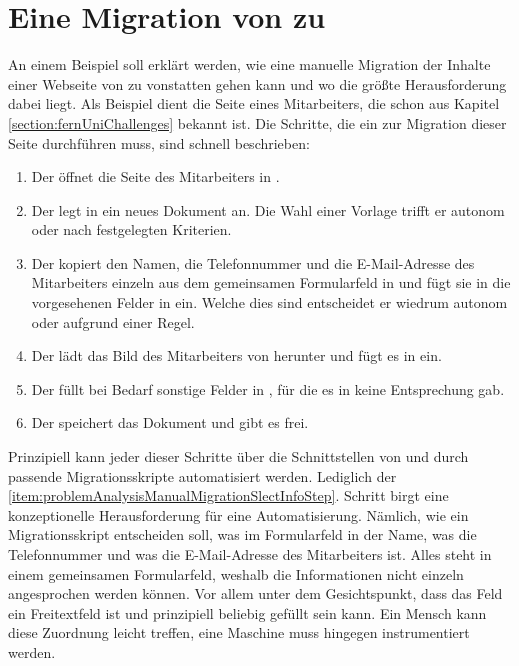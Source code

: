 \section{Eine Migration von {\wordpress} zu {\imperia}}
    An einem Beispiel soll erklärt werden,
    wie eine manuelle Migration der Inhalte einer Webseite von {\wordpress} zu {\imperia}
    vonstatten gehen kann und wo die größte Herausforderung dabei liegt.
    Als Beispiel dient die Seite eines Mitarbeiters,
    die schon aus Kapitel \ref{section:fernUniChallenges} bekannt ist.
    Die Schritte, die ein {\editor} zur Migration dieser Seite durchführen muss,
    sind schnell beschrieben:

    \begin{enumerate}
        \item   Der {\editor} öffnet die Seite des Mitarbeiters in {\wordpress}.
        \item   Der {\editor} legt in {\imperia} ein neues Dokument an.
                Die Wahl einer Vorlage trifft er autonom oder nach festgelegten Kriterien.
        \item   \label{item:problemAnalysisManualMigrationSlectInfoStep}Der {\editor} kopiert den Namen, die Telefonnummer und die E-Mail-Adresse
                des Mitarbeiters einzeln aus dem gemeinsamen Formularfeld in {\wordpress}
                und fügt sie in die vorgesehenen Felder in {\imperia} ein.
                Welche dies sind entscheidet er wiedrum autonom oder aufgrund einer Regel.
        \item   Der {\editor} lädt das Bild des Mitarbeiters von {\wordpress} herunter
                und fügt es in {\imperia} ein.
        \item   Der {\editor} füllt bei Bedarf sonstige Felder in {\imperia},
                für die es in {\wordpress} keine Entsprechung gab.
        \item   Der {\editor} speichert das Dokument und gibt es frei.
    \end{enumerate}

    Prinzipiell kann jeder dieser Schritte über die Schnittstellen von {\wordpress}
    und {\imperia} durch passende Migrationsskripte automatisiert werden.
    Lediglich der \ref{item:problemAnalysisManualMigrationSlectInfoStep}. Schritt
    birgt eine konzeptionelle Herausforderung für eine Automatisierung.
    Nämlich, wie ein Migrationsskript entscheiden soll, was im Formularfeld in {\wordpress}
    der Name, was die Telefonnummer und was die E-Mail-Adresse des Mitarbeiters ist.
    Alles steht in einem gemeinsamen Formularfeld, weshalb die Informationen nicht
    einzeln angesprochen werden können.
    Vor allem unter dem Gesichtspunkt, dass das Feld ein Freitextfeld ist und prinzipiell beliebig gefüllt sein kann.
    Ein Mensch kann diese Zuordnung leicht treffen,
    eine Maschine muss hingegen instrumentiert werden.
